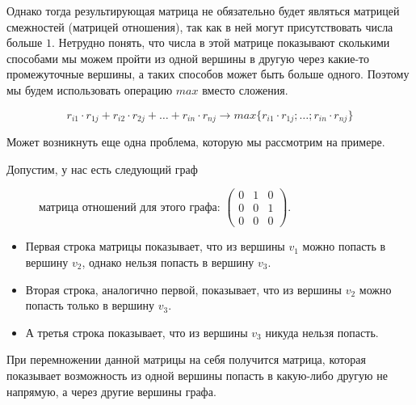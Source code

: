 \documentclass[russian]{lecture-notes}
\begin{document}
Однако тогда результирующая матрица не обязательно будет являться матрицей смежностей (матрицей отношения), так как в ней могут присутствовать числа больше $1$. Нетрудно понять, что числа в этой матрице показывают сколькими способами мы можем пройти из одной вершины в другую через какие-то промежуточные вершины, а таких способов может быть больше одного. Поэтому мы будем использовать операцию $max$ вместо сложения.

\[r_{i1} \cdot r_{1j} + r_{i2} \cdot r_{2j} + \ldots +r_{in} \cdot r_{nj} \rightarrow max\{r_{i1} \cdot r_{1j};\ldots;r_{in} \cdot r_{nj}\}\]

Может возникнуть еще одна проблема, которую мы рассмотрим на примере.

Допустим, у нас есть следующий граф
\begin{figure}[H]
    \centering

матрица отношений для этого графа:
    $\begin{pmatrix}
      0 & 1 & 0\\
      0 & 0 & 1\\
      0 & 0 & 0
    \end{pmatrix}
    $.    
\end{figure}

\begin{itemize}
\item Первая строка матрицы показывает, что из вершины $v_1$ можно попасть в вершину $v_2$, однако нельзя попасть в вершину $v_3$.
\item Вторая строка, аналогично первой, показывает, что из вершины $v_2$ можно попасть только в вершину $v_3$.
\item А третья строка показывает, что из вершины $v_3$ никуда нельзя попасть.
\end{itemize}


При перемножении данной матрицы на себя получится матрица, которая показывает возможность из одной вершины попасть в какую-либо другую не напрямую, а через другие вершины графа.
\end{document}
